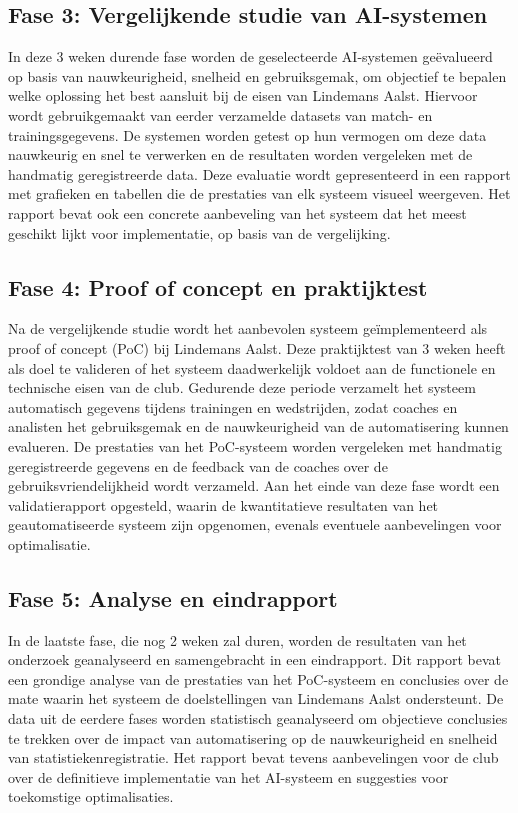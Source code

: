 \subsection{Fase 3: Vergelijkende studie van AI-systemen}
In deze 3 weken durende fase worden de geselecteerde AI-systemen geëvalueerd op basis van nauwkeurigheid, snelheid en gebruiksgemak, om objectief te bepalen welke oplossing het best aansluit bij de eisen van Lindemans Aalst. Hiervoor wordt gebruikgemaakt van eerder verzamelde datasets van match- en trainingsgegevens. De systemen worden getest op hun vermogen om deze data nauwkeurig en snel te verwerken en de resultaten worden vergeleken met de handmatig geregistreerde data. Deze evaluatie wordt gepresenteerd in een rapport met grafieken en tabellen die de prestaties van elk systeem visueel weergeven. Het rapport bevat ook een concrete aanbeveling van het systeem dat het meest geschikt lijkt voor implementatie, op basis van de vergelijking.
\subsection{Fase 4: Proof of concept en praktijktest}
Na de vergelijkende studie wordt het aanbevolen systeem geïmplementeerd als proof of concept (PoC) bij Lindemans Aalst. Deze praktijktest van 3 weken heeft als doel te valideren of het systeem daadwerkelijk voldoet aan de functionele en technische eisen van de club. Gedurende deze periode verzamelt het systeem automatisch gegevens tijdens trainingen en wedstrijden, zodat coaches en analisten het gebruiksgemak en de nauwkeurigheid van de automatisering kunnen evalueren. De prestaties van het PoC-systeem worden vergeleken met handmatig geregistreerde gegevens en de feedback van de coaches over de gebruiksvriendelijkheid wordt verzameld. Aan het einde van deze fase wordt een validatierapport opgesteld, waarin de kwantitatieve resultaten van het geautomatiseerde systeem zijn opgenomen, evenals eventuele aanbevelingen voor optimalisatie.
\subsection{Fase 5: Analyse en eindrapport}
In de laatste fase, die nog 2 weken zal duren, worden de resultaten van het onderzoek geanalyseerd en samengebracht in een eindrapport. Dit rapport bevat een grondige analyse van de prestaties van het PoC-systeem en conclusies over de mate waarin het systeem de doelstellingen van Lindemans Aalst ondersteunt. De data uit de eerdere fases worden statistisch geanalyseerd om objectieve conclusies te trekken over de impact van automatisering op de nauwkeurigheid en snelheid van statistiekenregistratie. Het rapport bevat tevens aanbevelingen voor de club over de definitieve implementatie van het AI-systeem en suggesties voor toekomstige optimalisaties.

